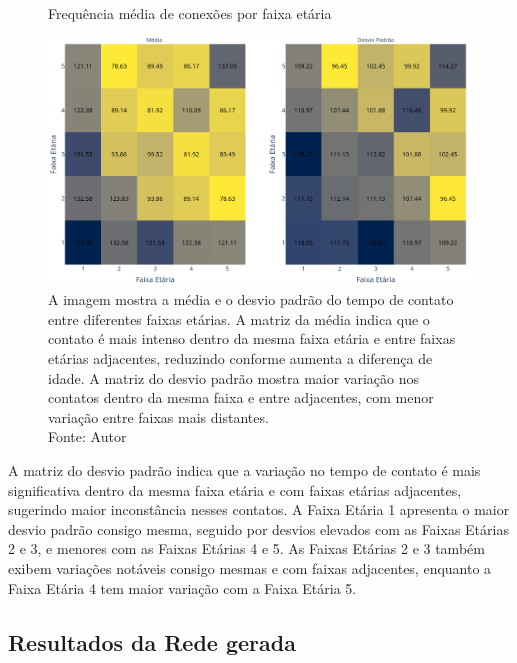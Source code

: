 \begin{figure}[H]
    \centering
    \captionsetup{font=normalsize,skip=0.8pt,singlelinecheck=on,labelsep=endash}
    \caption{Frequência média de conexões por faixa etária}
    \includegraphics[scale= 0.35]{figuras/media_std.png}
    \captionsetup{font=small,justification=justified}
    \caption*{A imagem mostra a média e o desvio padrão do tempo de contato entre diferentes faixas etárias. A matriz da média indica que o contato é mais intenso dentro da mesma faixa etária e entre faixas etárias adjacentes, reduzindo conforme aumenta a diferença de idade. A matriz do desvio padrão mostra maior variação nos contatos dentro da mesma faixa e entre adjacentes, com menor variação entre faixas mais distantes. \\Fonte: Autor}
    \label{fig:mediastd}
\end{figure}

A matriz do desvio padrão indica que a variação no tempo de contato é mais significativa dentro da mesma faixa etária e com faixas etárias adjacentes, sugerindo maior inconstância nesses contatos. A Faixa Etária 1 apresenta o maior desvio padrão consigo mesma, seguido por desvios elevados com as Faixas Etárias 2 e 3, e menores com as Faixas Etárias 4 e 5. As Faixas Etárias 2 e 3 também exibem variações notáveis consigo mesmas e com faixas adjacentes, enquanto a Faixa Etária 4 tem maior variação com a Faixa Etária 5.

\subsection{Resultados da Rede gerada}


